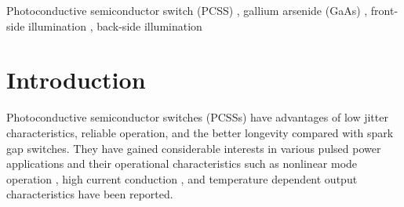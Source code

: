 \documentclass[final,5p,times,twocolumn]{elsarticle}
\begin{document}
\begin{frontmatter}





\begin{keyword}
Photoconductive semiconductor switch (PCSS) \sep
gallium arsenide (GaAs) \sep 
front-side illumination \sep 
back-side illumination



\end{keyword}

\end{frontmatter}


\section{Introduction}

   Photoconductive semiconductor switches (PCSSs) \cite{Loubriel1987,Nunnally1990,Pocha1990,Zutavern1991,Loubriel1997}
have advantages of low jitter characteristics, reliable operation, and the better longevity compared with spark gap switches.
   They have gained considerable interests in various pulsed power applications and their operational characteristics such as nonlinear mode operation \cite{Ruan2009}, high current conduction \cite{Shi2013}, and temperature dependent output characteristics \cite{Xu2016} have been reported.
  
\end{document}
